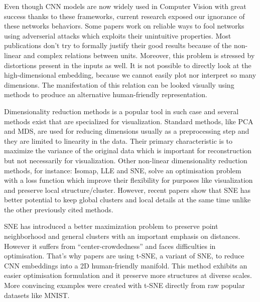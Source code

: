 \documentclass[a4paper,12pt]{report}
\begin{document}
Even though CNN models are now widely used in Computer Vision with great success thanks to these frameworks, current research exposed our ignorance of these networks behaviors.
Some papers work on reliable ways to fool networks using adverserial attacks which exploits their unintuitive properties\cite{szegedy2013intriguing}.
Most publications don't try to formally justify their good results because of the non-linear and complex relations between units. %
Moreover, this problem is stressed by distortions present in the inputs as well.
It is not possible to directly look at the high-dimensional embedding, because we cannot easily plot nor interpret so many dimensions.
The manifestation of this relation can be looked visually using methods to produce an alternative human-friendly representation.

Dimensionality reduction methods is a popular tool in such case\cite{dai2014document}\cite{taylor2011learning} and several methods exist that are specialized for visualization.
Standard methods, like PCA and MDS\cite{cox2000multidimensional}, are used for reducing dimensions usually as a preprocessing step and they are limited to linearity in the data.
Their primary characteristic is to maximize the variance of the original data which is important for reconstruction but not necessarily for visualization.
Other non-linear dimensionality reduction methods, for instance: Isomap\cite{tenenbaum2000global}, LLE\cite{roweis2000nonlinear} and SNE\cite{SNE}, solve an optimisation problem with a loss function which improve their flexibility for purposes like visualization and preserve local structure/cluster.
However, recent papers show that SNE has better potential to keep global clusters and local details at the same time unlike the other previously cited methods\cite{SNE}.

SNE has introduced a better maximization problem to preserve point neighborhood and general clusters with an important emphasis on distances\cite{SNE}.
However it suffers from ``center-crowdedness'' and faces difficulties in optimisation\cite{t-SNE}.
That's why papers are using t-SNE, a variant of SNE, to reduce CNN embeddings into a 2D human-friendly manifold. %
This method exhibits an easier optimisation formulation and it preserve more structures at diverse scales.
More convincing examples were created with t-SNE directly from raw popular datasets\cite{van2009new} like MNIST\cite{t-SNE}.
\end{document}
